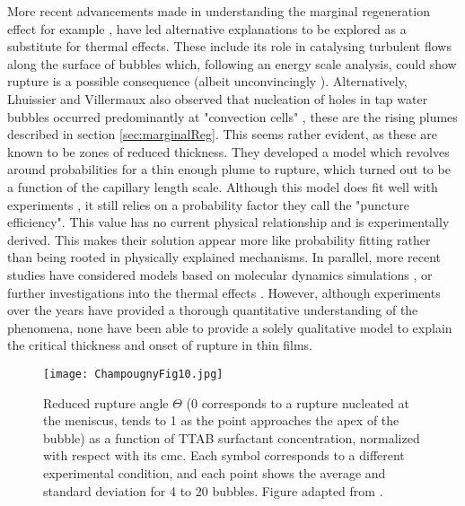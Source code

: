 \documentclass[a4paper,12pt]{article}
\numberwithin{equation}{section}
\numberwithin{figure}{section}
\numberwithin{table}{section}
\begin{document}
More recent advancements made in understanding the marginal regeneration effect for example \cite{Bhamla2017}, have led alternative explanations to be explored as a substitute for thermal effects. These include its role in catalysing turbulent flows along the surface of bubbles which, following an energy scale analysis, could show rupture is a possible consequence (albeit unconvincingly \cite{Lhuissier2011}). Alternatively, Lhuissier and Villermaux also observed that nucleation of holes in tap water bubbles occurred predominantly at "convection cells" \cite{Lhuissier2011}, these are the rising plumes described in section \ref{sec:marginalReg}. This seems rather evident, as these are known to be zones of reduced thickness. They developed a model which revolves around probabilities for a thin enough plume to rupture, which turned out to be a function of the capillary length scale. Although this model does fit well with experiments \cite{Modini2013}, it still relies on a probability factor they call the "puncture efficiency". This value has no current physical relationship and is experimentally derived. This makes their solution appear more like probability fitting rather than being rooted in physically explained mechanisms. In parallel, more recent studies have considered models based on molecular dynamics simulations \cite{Nguyen2014}, or further investigations into the thermal effects \cite{Shah2019}. However, although experiments over the years have provided a thorough quantitative understanding of the phenomena, none have been able to provide a solely qualitative model to explain the critical thickness and onset of rupture in thin films.

\begin{figure}[!htbp]
    \centering
    \captionsetup{width=.9\linewidth}
    \texttt{[image: ChampougnyFig10.jpg]}
    \caption{Reduced rupture angle $\Theta$ (0 corresponds to a rupture nucleated at the meniscus, tends to 1 as the point approaches the apex of the bubble) as a function of TTAB surfactant concentration, normalized with respect with its cmc. Each symbol corresponds to a different experimental condition, and each point shows the average and standard deviation for 4 to 20 bubbles. Figure adapted from \cite{ChampougnyNotBare2016}.}
    \label{fig:ChampougnyFig10}
\end{figure}
\end{document}
